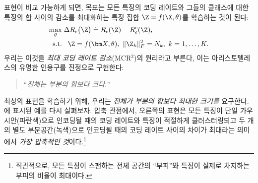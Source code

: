 \documentclass[../../book-main_ko.tex]{subfiles}
\begin{document}
표현이 비교 가능하게 되면, 목표는 모든 특징의 코딩 레이트와 그들의 클래스에 대한 특징의 합 사이의 감소를 최대화하는 특징 집합 $\Z  = f(\X, \theta)$를 학습하는 것이 된다:
\begin{equation}
	\begin{aligned}
		\max_{\theta } & \;  \Delta R_{\epsilon}\big(\Z \big) \doteq R_{\epsilon}(\Z) - R_{\epsilon}^c(\Z ), \\
		\mbox{s.t.} & \ \ \, \Z = f(\bm X, \theta),\  \|\Z_k\|_F^2                                          = N_k,\ k=1,\dots,K.
	\end{aligned}
	\label{eqn:maximal-rate-reduction}
\end{equation}
우리는 이것을 {\em 최대 코딩 레이트 감소}(MCR$^2$)의 원리라고 부른다,
이는 아리스토텔레스의 유명한 인용구를 진정으로 구현한다:
\begin{quote}
	\centering
	``{\em 전체는 부분의 합보다 크다.}''
\end{quote}
최상의 표현을 학습하기 위해, 우리는 {\em 전체가 부분의 합보다 최대한 크기를} 요구한다. 에 표시된 예를 다시 살펴보자. 압축 관점에서, 오른쪽의 표현은 모든 특징이 단일 가우시안(파란색)으로 인코딩될 때의 코딩 레이트와 특징이 적절하게 클러스터링되고 두 개의 별도 부분공간(녹색)으로 인코딩될 때의 코딩 레이트 사이의 차이가 최대라는 의미에서 {\em 가장 압축적인 것}이다.\footnote{직관적으로, 모든 특징이 스팬하는 전체 공간의 ``부피''와 특징이 실제로 차지하는 부피의 비율이 최대이다.}
\end{document}
